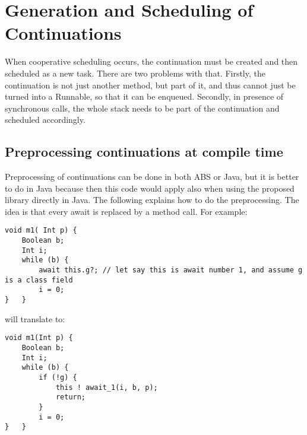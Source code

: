 \section{Generation and Scheduling of Continuations}
\label{comp}

When cooperative scheduling occurs, the continuation must be created and then scheduled as a new task. There are two problems with that. Firstly, the continuation is not just another method, but part of it, and thus cannot just be turned into a Runnable, so that it can be enqueued. Secondly, in presence of synchronous calls, the whole stack needs to be part of the continuation and scheduled accordingly. 


\subsection{Preprocessing continuations at compile time}
Preprocessing of continuations can be done in both ABS or Java, but it is better to do in Java because then this code would apply also when using the proposed library directly in Java. The following explains how to do the preprocessing. The idea is that every await is replaced by a method call. For example:

\begin{lstlisting}
void m1( Int p) {
	Boolean b;
	Int i;
	while (b) {
		await this.g?; // let say this is await number 1, and assume g is a class field
		i = 0;
}	}
\end{lstlisting}

will translate to:
\begin{lstlisting}
void m1(Int p) {
	Boolean b;
	Int i;
	while (b) { 
		if (!g) {
			this ! await_1(i, b, p); 
			return;
		}
		i = 0;
}	}
\end{lstlisting}

